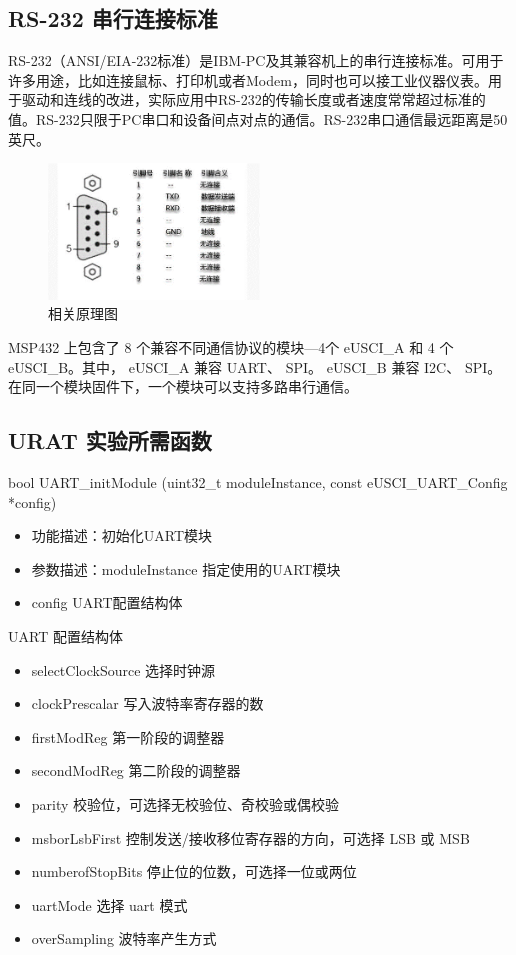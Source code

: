 \documentclass[a4paper,10pt,UTF8]{paper}
\numberwithin{equation}{section}
\numberwithin{figure}{section}
\begin{document}
\subsection{RS-232 串行连接标准}

RS-232（ANSI/EIA-232标准）是IBM-PC及其兼容机上的串行连接标准。可用于许多用途，比如连接鼠标、打印机或者Modem，同时也可以接工业仪器仪表。用于驱动和连线的改进，实际应用中RS-232的传输长度或者速度常常超过标准的值。RS-232只限于PC串口和设备间点对点的通信。RS-232串口通信最远距离是50英尺。

\begin{figure}[h]
  \centering
  \includegraphics[width=0.5\textwidth]{img/3.PNG}
  \caption{相关原理图}
  \label{fig:3}
\end{figure}

MSP432 上包含了 8 个兼容不同通信协议的模块—4个 eUSCI\_A 和 4 个 eUSCI\_B。其中， eUSCI\_A 兼容 UART、 SPI。 eUSCI\_B 兼容 I2C、 SPI。在同一个模块固件下，一个模块可以支持多路串行通信。

\subsection{URAT 实验所需函数}

\begin{ccode}
  bool UART_initModule (uint32_t moduleInstance, 
          const eUSCI_UART_Config *config)
\end{ccode}

\begin{itemize}
  \item 功能描述：初始化UART模块
  \item 参数描述：moduleInstance  指定使用的UART模块
  \item config    UART配置结构体
\end{itemize}

UART 配置结构体

\begin{itemize}
  \item selectClockSource  选择时钟源
  \item clockPrescalar     写入波特率寄存器的数
  \item firstModReg     第一阶段的调整器
  \item secondModReg     第二阶段的调整器
  \item parity             校验位，可选择无校验位、奇校验或偶校验
  \item msborLsbFirst     控制发送/接收移位寄存器的方向，可选择 LSB 或 MSB
  \item numberofStopBits   停止位的位数，可选择一位或两位
  \item uartMode     选择 uart 模式
  \item overSampling     波特率产生方式
\end{itemize}
\end{document}
